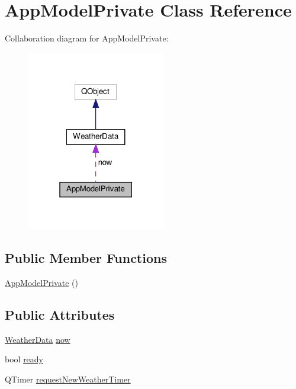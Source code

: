 \hypertarget{class_app_model_private}{}\section{App\+Model\+Private Class Reference}
\label{class_app_model_private}


Collaboration diagram for App\+Model\+Private\+:
\nopagebreak
\begin{figure}[H]
\begin{center}
\leavevmode
\includegraphics[width=171pt]{class_app_model_private__coll__graph}
\end{center}
\end{figure}
\subsection*{Public Member Functions}
\begin{DoxyCompactItemize}
\item 
\hyperlink{class_app_model_private_ac7e4e160306c7ff9c771d2dd34c243ac}{App\+Model\+Private} ()
\end{DoxyCompactItemize}
\subsection*{Public Attributes}
\begin{DoxyCompactItemize}
\item 
\hyperlink{class_weather_data}{Weather\+Data} \hyperlink{class_app_model_private_adacce6c96a2a7b0b825586a63a15bcac}{now}
\item 
bool \hyperlink{class_app_model_private_ab0434f387adadf9ed65183496fe80f77}{ready}
\item 
Q\+Timer \hyperlink{class_app_model_private_ad073c8bcf6739fd658009860e12aa72c}{request\+New\+Weather\+Timer}
\end{DoxyCompactItemize}


